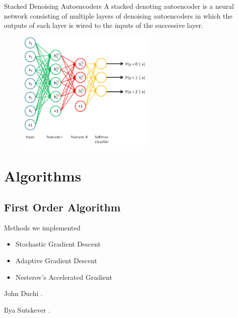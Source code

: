 \documentclass{beamer}
\begin{document}
\begin{frame}{Stacked Denoising Autoencoders}
A stacked denoting autoencoder is a neural network consisting of multiple layers of denoising autoencoders in which the outputs of each layer is wired to the inputs of the successive layer.


\begin{figure}[h!]
\centering
\includegraphics[width=0.6\textwidth]{Stacked.png}
\end{figure}

\end{frame}

\section{Algorithms}

\subsection{First Order Algorithm}
\begin{frame}{Methods we implemented}
\begin{itemize}
\item Stochastic Gradient Descent 
\item Adaptive Gradient Descent
\item Nesterov's  Accelerated Gradient
\end{itemize}

\begin{thebibliography}{9}
\beamertemplatebookbibitems
{}
John Duchi 
.
\end{thebibliography}

\begin{thebibliography}{9}
\beamertemplatebookbibitems
{}
Ilya Sutskever
.
\end{thebibliography}


\end{frame}
\end{document}
